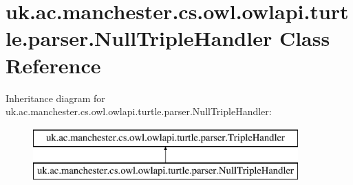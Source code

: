 \hypertarget{classuk_1_1ac_1_1manchester_1_1cs_1_1owl_1_1owlapi_1_1turtle_1_1parser_1_1_null_triple_handler}{\section{uk.\-ac.\-manchester.\-cs.\-owl.\-owlapi.\-turtle.\-parser.\-Null\-Triple\-Handler Class Reference}
\label{classuk_1_1ac_1_1manchester_1_1cs_1_1owl_1_1owlapi_1_1turtle_1_1parser_1_1_null_triple_handler}
}
Inheritance diagram for uk.\-ac.\-manchester.\-cs.\-owl.\-owlapi.\-turtle.\-parser.\-Null\-Triple\-Handler\-:\begin{figure}[H]
\begin{center}
\leavevmode
\includegraphics[height=2.000000cm]{classuk_1_1ac_1_1manchester_1_1cs_1_1owl_1_1owlapi_1_1turtle_1_1parser_1_1_null_triple_handler}
\end{center}
\end{figure}
